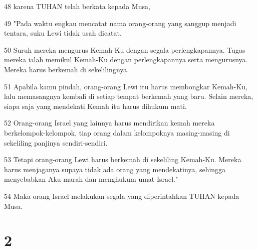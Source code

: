 \par 48 karena TUHAN telah berkata kepada Musa,
\par 49 "Pada waktu engkau mencatat nama orang-orang yang sanggup menjadi tentara, suku Lewi tidak usah dicatat.
\par 50 Suruh mereka mengurus Kemah-Ku dengan segala perlengkapannya. Tugas mereka ialah memikul Kemah-Ku dengan perlengkapannya serta mengurusnya. Mereka harus berkemah di sekelilingnya.
\par 51 Apabila kamu pindah, orang-orang Lewi itu harus membongkar Kemah-Ku, lalu memasangnya kembali di setiap tempat berkemah yang baru. Selain mereka, siapa saja yang mendekati Kemah itu harus dihukum mati.
\par 52 Orang-orang Israel yang lainnya harus mendirikan kemah mereka berkelompok-kelompok, tiap orang dalam kelompoknya masing-masing di sekeliling panjinya sendiri-sendiri.
\par 53 Tetapi orang-orang Lewi harus berkemah di sekeliling Kemah-Ku. Mereka harus menjaganya supaya tidak ada orang yang mendekatinya, sehingga menyebabkan Aku marah dan menghukum umat Israel."
\par 54 Maka orang Israel melakukan segala yang diperintahkan TUHAN kepada Musa.

\chapter{2}

